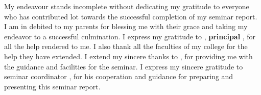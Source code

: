 My endeavour stands incomplete without dedicating my gratitude to everyone who has
contributed lot towards the successful completion of my seminar report. I am in debited
to my parents for blessing me with their grace and taking my endeavor to a successful
culmination. I express my gratitude to \textbf{\guide{}}, \textbf{principal \prince{}}, \instis{} for all the help rendered
to me. I also thank all the faculties of my college for the help they have extended. I
extend my sincere thanks to \textbf{\guide{}}, \reportTitle{} for providing me with the guidance and facilities for the seminar. I
express my sincere gratitude to seminar coordinator \textbf{\coord{}}, for his cooperation and guidance for preparing and presenting this seminar
report.
 
